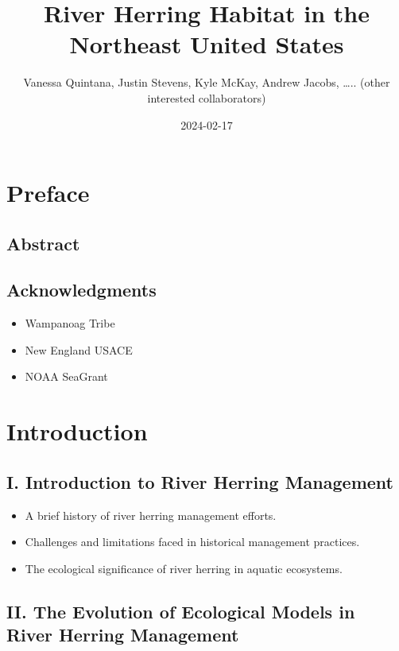 \documentclass[
]{book}
\title{River Herring Habitat in the Northeast United States}
\author{Vanessa Quintana, Justin Stevens, Kyle McKay, Andrew Jacobs, \ldots.. (other interested collaborators)}
\date{2024-02-17}
\providecommand{\tightlist}{%
  \setlength{\itemsep}{0pt}\setlength{\parskip}{0pt}}
\begin{document}
\maketitle

{
\setcounter{tocdepth}{1}
\tableofcontents
}
\hypertarget{preface}{%
\chapter*{Preface}\label{preface}}

\hypertarget{abstract}{%
\section{Abstract}\label{abstract}}

\hypertarget{acknowledgments}{%
\section{Acknowledgments}\label{acknowledgments}}

\begin{itemize}
\tightlist
\item
  Wampanoag Tribe
\item
  New England USACE
\item
  NOAA SeaGrant
\end{itemize}

\hypertarget{introduction}{%
\chapter{Introduction}\label{introduction}}

\hypertarget{i.-introduction-to-river-herring-management}{%
\section{I. Introduction to River Herring Management}\label{i.-introduction-to-river-herring-management}}

\begin{itemize}
\tightlist
\item
  A brief history of river herring management efforts.
\item
  Challenges and limitations faced in historical management practices.
\item
  The ecological significance of river herring in aquatic ecosystems.
\end{itemize}

\hypertarget{ii.-the-evolution-of-ecological-models-in-river-herring-management}{%
\section{II. The Evolution of Ecological Models in River Herring Management}\label{ii.-the-evolution-of-ecological-models-in-river-herring-management}}
\end{document}
